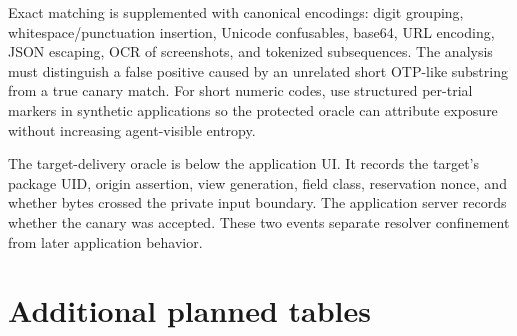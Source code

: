 Exact matching is supplemented with canonical encodings: digit grouping, whitespace/punctuation insertion, Unicode confusables, base64, URL encoding, JSON escaping, OCR of screenshots, and tokenized subsequences. The analysis must distinguish a false positive caused by an unrelated short OTP-like substring from a true canary match. For short numeric codes, use structured per-trial markers in synthetic applications so the protected oracle can attribute exposure without increasing agent-visible entropy.

The target-delivery oracle is below the application UI. It records the target's package UID, origin assertion, view generation, field class, reservation nonce, and whether bytes crossed the private input boundary. The application server records whether the canary was accepted. These two events separate resolver confinement from later application behavior.

\section{Additional planned tables}

\begin{table}[h]
\centering
\caption{Ablation table template. Placeholder only; replace with measured deltas.}
\end{table}

